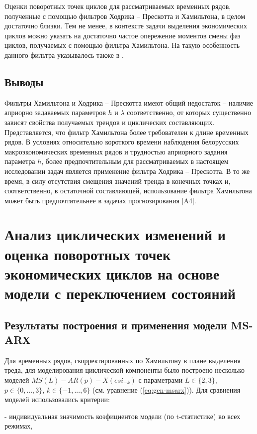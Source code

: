 \documentclass[a4paper,14pt]{extreport}
\begin{document}
	Оценки поворотных точек циклов для рассматриваемых временных рядов, полученные с помощью фильтров Ходрика -- Прескотта и Хамильтона, в целом достаточно близки. Тем не менее, в контексте задачи выделения экономических циклов можно указать на достаточно частое опережение моментов смены фаз циклов, получаемых с помощью фильтра Хамильтона. На такую особенность данного фильтра указывалось также в \cite{schuler_detrend}.
	
	\subsection{Выводы}
	
	Фильтры Хамильтона и Ходрика -- Прескотта  имеют  общий недостаток -- наличие априорно задаваемых параметров $h$ и $\lambda$ соответственно, от которых существенно зависят свойства получаемых трендов и циклических составляющих. Представляется, что фильтр Хамильтона более требователен к длине временных рядов.  В условиях относительно короткого времени наблюдения белорусских макроэкономических временных рядов и трудностью априорного задания параметра $h$, более предпочтительным для рассматриваемых в настоящем исследовании задач является применение фильтра Ходрика -- Прескотта. В то же время, в силу отсутствия смещения значений тренда в конечных точках и, соответственно, в остаточной составляющей, использование фильтра Хамильтона может быть предпочтительнее в  задачах прогнозирования [A4].
	

	\section{Анализ циклических изменений и оценка поворотных точек экономических циклов на основе модели с переключением состояний}
	
	\subsection{Результаты построения и применения модели MS-ARХ}
	
	Для временных рядов, скорректированных по Хамильтону в плане выделения треда, для моделирования циклической компоненты было построено несколько моделей $MS(L)-AR(p)-X(esi_{-k})$ с параметрами $L \in \{2,3\}$, $p \in \{0, ..., 3\}$, $k \in \{-1, ..., 6\}$ (см. уравнение (\ref{eq:gen-msarx})). Для сравнения моделей использовались критерии:
	
	- индивидуальная значимость коэфициентов модели (по t-статистике) во всех режимах,
	
\end{document}
